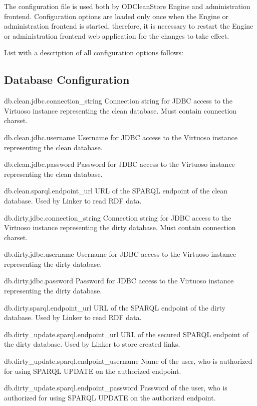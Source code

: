 The configuration file is used both by ODCleanStore Engine and administration frontend. Configuration options are loaded only once when the Engine or administration frontend is started, therefore, it is necessary to restart the Engine or administration frontend web application for the changes to take effect.

List with a description of all configuration options follows:

\subsection*{Database Configuration}
\begin{configlist}
	\item[db.clean.jdbc.connection\_string]
	  Connection string for JDBC access to the Virtuoso instance representing the clean database. Must contain connection charset.
	\item[db.clean.jdbc.username]
	  Username for JDBC access to the Virtuoso instance representing the clean database.
	\item[db.clean.jdbc.password]
	  Password for JDBC access to the Virtuoso instance representing the clean database.
	\item[db.clean.sparql.endpoint\_url]
	  URL of the SPARQL endpoint of the clean database. Used by Linker to read RDF data.

	\item[db.dirty.jdbc.connection\_string]
		Connection string for JDBC access to the Virtuoso instance representing the dirty database. Must contain connection charset.
	\item[db.dirty.jdbc.username]
		Username for JDBC access to the Virtuoso instance representing the dirty database.
	\item[db.dirty.jdbc.password]
		Password for JDBC access to the Virtuoso instance representing the dirty database.
		
	\item[db.dirty.sparql.endpoint\_url]
		URL of the SPARQL endpoint of the dirty database. Used by Linker to read RDF data.
	\item[db.dirty\_update.sparql.endpoint\_url]
		URL of the secured SPARQL endpoint of the dirty database. Used by Linker to store created links.
	\item[db.dirty\_update.sparql.endpoint\_username]
		Name of the user, who is authorized for using SPARQL UPDATE on the authorized endpoint.
	\item[db.dirty\_update.sparql.endpoint\_password]
		Password of the user, who is authorized for using SPARQL UPDATE on the authorized endpoint.
\end{configlist}

